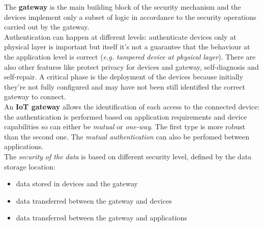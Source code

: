 \documentclass[10pt,a4paper]{report}
\theoremstyle{definition}
\begin{document}
The \textbf{gateway} is the main building block of the security mechanism and the devices implement only a subset of logic in accordance to the security operations carried out by the gateway.\\
Authentication can happen at different levels: authenticate devices only at physical layer is important but itself it's not a guarantee that the behaviour at the application level is correct (\textit{e.g. tampered device at physical layer}).
There are also other features like protect privacy for devices and gateway, self-diagnosis and self-repair.
A critical phase is the deployment of the devices because initially they're not fully configured and may have not been still identified the correct gateway to connect.\\
An \textbf{IoT gateway} allows the identification of each access to the connected device: the authentication is performed based on application requirements and device capabilities so can either be \textit{mutual} or \textit{one-way}. The first type is more robust than the second one. The \textit{mutual authentication} can also be perfomed between applications.\\
The \textit{security of the data} is based on different security level, defined by the data storage location:
\begin{itemize}
	\item data stored in devices and the gateway 
	\item data transferred between the gateway and devices
	\item data transferred between the gateway and applications
\end{itemize}
\end{document}
